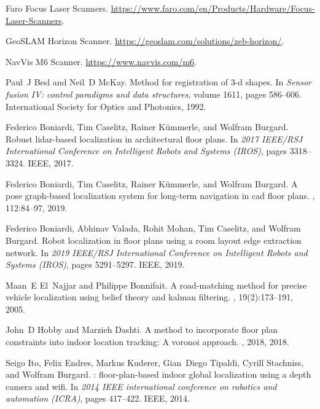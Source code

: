 \documentclass[letterpaper, 10 pt, conference]{ieeeconf}  %
\begin{document}
\begin{thebibliography}{10}

  {Faro Focus Laser Scanners}.
  \newblock \url{https://www.faro.com/en/Products/Hardware/Focus-Laser-Scanners}.
  
  {GeoSLAM Horizon Scanner}.
  \newblock \url{https://geoslam.com/solutions/zeb-horizon/}.
  
  {NavVis M6 Scanner}.
  \newblock \url{https://www.navvis.com/m6}.
  
  Paul~J Besl and Neil~D McKay.
  \newblock Method for registration of 3-d shapes.
  \newblock In {\em Sensor fusion IV: control paradigms and data structures},
    volume 1611, pages 586--606. International Society for Optics and Photonics,
    1992.
  
  Federico Boniardi, Tim Caselitz, Rainer K{\"u}mmerle, and Wolfram Burgard.
  \newblock Robust lidar-based localization in architectural floor plans.
  \newblock In {\em 2017 IEEE/RSJ International Conference on Intelligent Robots
    and Systems (IROS)}, pages 3318--3324. IEEE, 2017.
  
  Federico Boniardi, Tim Caselitz, Rainer K{\"u}mmerle, and Wolfram Burgard.
  \newblock A pose graph-based localization system for long-term navigation in
    cad floor plans.
  , 112:84--97, 2019.
  
  Federico Boniardi, Abhinav Valada, Rohit Mohan, Tim Caselitz, and Wolfram
    Burgard.
  \newblock Robot localization in floor plans using a room layout edge extraction
    network.
  \newblock In {\em 2019 IEEE/RSJ International Conference on Intelligent Robots
    and Systems (IROS)}, pages 5291--5297. IEEE, 2019.
  
  Maan~E El~Najjar and Philippe Bonnifait.
  \newblock A road-matching method for precise vehicle localization using belief
    theory and kalman filtering.
  , 19(2):173--191, 2005.
  
  John~D Hobby and Marzieh Dashti.
  \newblock A method to incorporate floor plan constraints into indoor location
    tracking: A voronoi approach.
  , 2018, 2018.
  
  Seigo Ito, Felix Endres, Markus Kuderer, Gian~Diego Tipaldi, Cyrill Stachniss,
    and Wolfram Burgard.
  : floor-plan-based indoor global localization using a depth
    camera and wifi.
  \newblock In {\em 2014 IEEE international conference on robotics and automation
    (ICRA)}, pages 417--422. IEEE, 2014.
  

\end{thebibliography}
\end{document}
